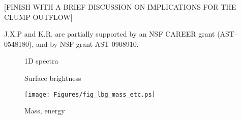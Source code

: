 \documentclass[12pt,preprint]{aastex}
\begin{document}
[FINISH WITH A BRIEF DISCUSSION ON IMPLICATIONS FOR THE CLUMP OUTFLOW]

\acknowledgments

J.X.P and K.R. are partially supported
by an NSF CAREER grant (AST--0548180), and 
by NSF grant AST-0908910.

\clearpage

%
%



\clearpage

%

\begin{figure}
\caption{
1D spectra
}
\label{fig:1D}
\end{figure}

\begin{figure}
\caption{
Surface brightness
}
\label{fig:SB}
\end{figure}

\begin{figure}
\texttt{[image: Figures/fig\_lbg\_mass\_etc.ps]}
\caption{
Mass, energy
}
\label{fig:mass_energy}
\end{figure}
\end{document}
